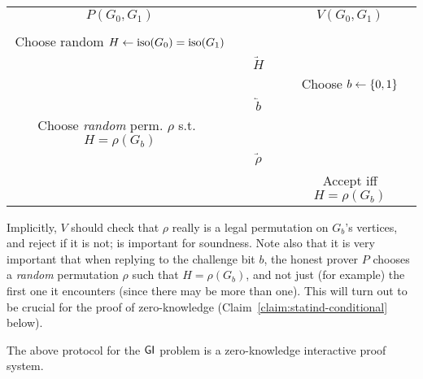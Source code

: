 \documentclass[11pt]{article}
\begin{document}
\begin{center}
  \begin{tabular}{ccc}
    $P(G_0,G_1)$ & & $V(G_0, G_1)$ \\ \\
    Choose random $H \gets \text{iso}(G_0) = \text{iso}(G_{1})$ & & \\
    & $\underrightarrow{\quad H \quad }$ & \\
    && Choose $b \gets \{0,1\}$\\
    & $\underleftarrow{\quad b \quad}$ & \\
    Choose \emph{random} perm. $\rho$ s.t.~$H=\rho(G_b)$&& \\
    & $\underrightarrow{\quad \rho \quad}$ & \\
    && Accept iff $H=\rho(G_b)$
  \end{tabular}
\end{center}

Implicitly, $V$ should check that $\rho$ really is a legal permutation
on $G_{b}$'s vertices, and reject if it is not; is important for
soundness.  Note also that it is very important that when replying to
the challenge bit $b$, the honest prover $P$ chooses a \emph{random}
permutation $\rho$ such that $H = \rho(G_{b})$, and not just (for
example) the first one it encounters (since there may be more than
one).  This will turn out to be crucial for the proof of
zero-knowledge (Claim~\ref{claim:statind-conditional} below).

\begin{theorem}
  \label{thm:gi-zkp}
  The above protocol for the $\mathsf{GI}$ problem is a zero-knowledge
  interactive proof system.
\end{theorem}
\end{document}
